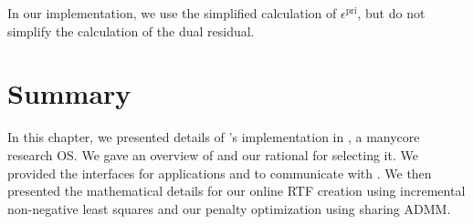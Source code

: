 In our implementation, we use the simplified calculation of 
$\epsilon^\mathrm{pri}$,
but do not simplify the calculation of the dual residual.



\section{Summary}

In this chapter, we presented details of \pacora's implementation in \tess, a manycore research OS. We gave an overview of \tess and our rational for selecting it.  We provided the interfaces for applications and \tess to communicate with \pacora.  We then presented the mathematical details for our online RTF creation using incremental non-negative least squares and our penalty optimization using sharing ADMM.



